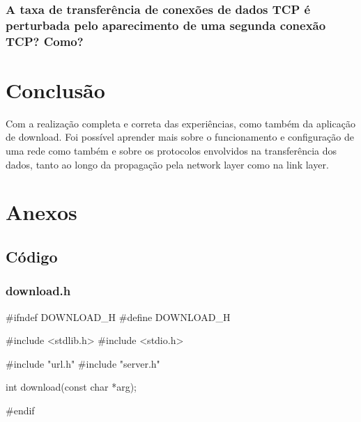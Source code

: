 \documentclass[11pt,a4paper,twocolumn]{article}
\begin{document}
\subsubsection{A taxa de transferência de conexões de dados TCP é perturbada pelo aparecimento de uma segunda conexão TCP? Como?}





\section{Conclusão}

Com a realização completa e correta das experiências, como também da aplicação de download. Foi possível aprender mais sobre o funcionamento e configuração de uma rede como também e sobre os protocolos envolvidos na transferência dos dados, tanto ao longo da propagação pela network layer como na link layer.



\section{Anexos}


\subsection{Código}

\subsubsection{download.h}
\begin{c-darktheme}
    #ifndef DOWNLOAD_H
    #define DOWNLOAD_H

    #include <stdlib.h>
    #include <stdio.h>

    #include "url.h"
    #include "server.h"

    int download(const char *arg);

    #endif
\end{c-darktheme}
\end{document}
